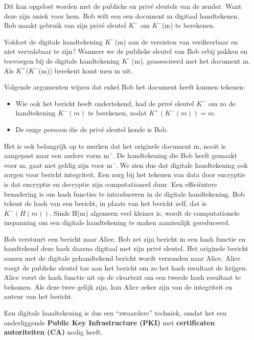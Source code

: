 \noindent Dit kan opgelost worden met de publieke en privé sleutels van de zender. Want deze zijn uniek voor hem. Bob wilt een een document m digitaal handtekenen. Bob maakt gebruik van zijn privé sleutel $K^-$ om $K^-$(m) te berekenen.

\noindent Voldoet de digitale handtekening $K^-$(m) aan de vereisten van verifieerbaar en niet vervalsbaar te zijn? Wanneer we de publieke sleutel van Bob erbij pakken en toevoegen bij de digitale handtekening $K^-$(m), geassocieerd met het document m. Als $K^+$($K^-$(m)) berekent komt men m uit. 

\noindent Volgende argumenten wijzen dat enkel Bob het document heeft kunnen tekenen:
\begin{itemize}
\item Wie ook het bericht heeft ondertekend, had de privé sleutel $K^-$ om zo de handtekening $K^- (m)$ te berekenen, zodat $K^+(K^- (m)) = m$.
\item De enige persoon die de privé sleutel kende is Bob.
\end{itemize}
\noindent Het is ook belangrijk op te merken dat het originele document m, nooit is aangepast naar een andere vorm m´. De handtekening die Bob heeft gemaakt voor m, gaat niet geldig zijn voor m´. We zien dus dat digitale handtekening ook zorgen voor bericht integriteit.
Een zorg bij het tekenen van data door encryptie is dat encryptie en decryptie zijn computationeel duur. Een efficiëntere benadering is om hash functies te introduceren in de digitale handtekening. Bob tekent de hash van een bericht, in plaats van het bericht zelf, dat is $K^{-}(H(m))$. Sinds H(m) algemeen veel kleiner is, wordt de computationele inspanning om een digitale handtekening te maken aanzienlijk gereduceerd.

\noindent Bob verstuurt een bericht naar Alice. Bob zet zijn bericht in een hash functie en handtekend deze hash daarna digitaal met zijn privé sleutel. Het originele bericht samen met de digitale gehandtekend bericht wordt verzonden naar Alice. Alice voegt de publieke sleutel toe aan het bericht om zo het hash resultaat de krijgen. Alice voert de hash functie uit op de cleartext om een tweede hash resultaat te bekomen. Als deze twee gelijk zijn, kan Alice zeker zijn van de integriteit en auteur van het bericht.

\noindent Een digitale handtekening is dus een “zwaardere” techniek, omdat het een onderliggende \textbf{Public Key Infrastructure (PKI)} met \textbf{certificaten autoriteiten (CA)} nodig heeft.

